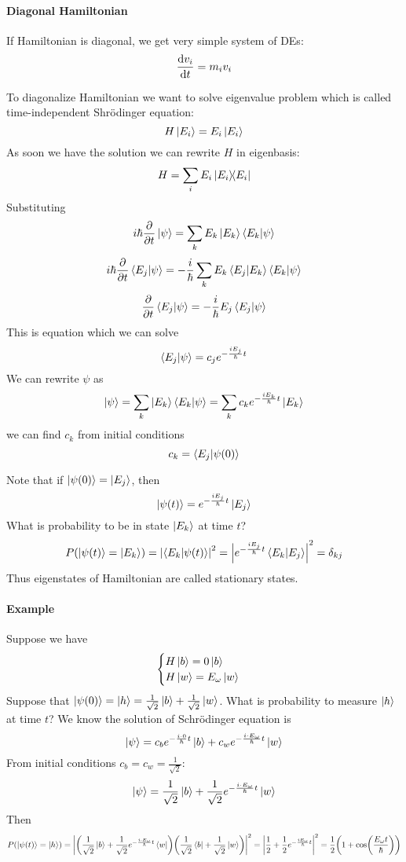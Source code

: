 \paragraph{Diagonal Hamiltonian}
If Hamiltonian is diagonal, we get very simple system of DEs:
$$\dv{v_i}{t} = m_iv_i$$

To diagonalize Hamiltonian we want to solve eigenvalue problem which is called time-independent Shr\"{o}dinger equation:
$$H\ket{E_i} = E_i \ket{E_i}$$
As soon we have the solution we can rewrite $H$ in eigenbasis:
$$H = \sum_i E_i \dyad{E_i}{E_i}$$
Substituting
$$i\hbar \pdv{t} \ket{\psi} = \sum_k E_k \ket{E_k}\braket{E_k}{\psi}$$
$$i\hbar \pdv{t} \braket{E_j}{\psi} = -\frac{i}{\hbar} \sum_k E_k \braket{E_j}{E_k} \braket{E_k}{\psi}$$
$$ \pdv{t} \braket{E_j}{\psi} = -\frac{i}{\hbar} E_j \braket{E_j}{\psi}$$
This is equation which we can solve
$$\braket{E_j}{\psi} = c_j e^{-\frac{iE_j}{\hbar}t}$$
We can rewrite $\psi$ as
$$\ket{\psi} = \sum_k \ket{E_k} \braket{E_k}{\psi} = \sum_k c_ke^{-\frac{iE_k}{\hbar}t} \ket{E_k}$$
we can find $c_k$ from initial conditions
$$c_k = \braket{E_j}{\psi(0)}$$

Note that if $\ket{\psi(0)} = \ket{E_j}$, then 
$$\ket{\psi(t)} = e^{-\frac{iE_j}{\hbar}t}\ket{E_j}$$
What is probability to be in state $\ket{E_k}$ at time $t$?
$$P(\ket{\psi(t)} = \ket{E_k}) = \abs{\braket{E_k}{\psi(t)}}^2 = \abs{e^{-\frac{iE_j}{\hbar}t}\braket{E_k}{E_j}}^2 = \delta_{kj}$$
Thus eigenstates of Hamiltonian are called stationary states.
\paragraph{Example}
Suppose we have
$$\begin{cases}
H\ket{b} = 0\ket{b}\\
H\ket{w} = E_\omega \ket{w}
\end{cases}$$
Suppose that $\ket{\psi(0)} = \ket{h} = \frac{1}{\sqrt{2}}\ket{b}+\frac{1}{\sqrt{2}}\ket{w}$. What is probability to measure $\ket{h}$ at time $t$?
We know the solution of Schr\"{o}dinger equation is
$$\ket{\psi} = c_be^{-\frac{i \cdot 0}{\hbar}t}\ket{b}+c_we^{-\frac{i\cdot E_\omega}{\hbar}t}\ket{w}$$
From initial conditions $c_b=c_w = \frac{1}{\sqrt{2}}$:
$$\ket{\psi} = \frac{1}{\sqrt{2}}\ket{b}+\frac{1}{\sqrt{2}}e^{-\frac{i\cdot E_\omega}{\hbar}t}\ket{w}$$
Then
$$P(\ket{\psi(t)} = \ket{h}) = \abs{\qty(\frac{1}{\sqrt{2}}\ket{b}+\frac{1}{\sqrt{2}}e^{-\frac{i\cdot E_\omega}{\hbar}t}\bra{w})\qty(\frac{1}{\sqrt{2}}\bra{b}+\frac{1}{\sqrt{2}}\ket{w})}^2 = \abs{\frac{1}{2} + \frac{1}{2} e^{-\frac{iE_\omega}{\hbar}t} }^2 = \frac{1}{2} \qty(1+ \cos(\frac{E_\omega t}{\hbar}))$$
